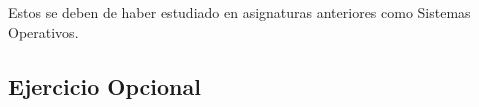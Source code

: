 
Estos se deben de haber estudiado en asignaturas anteriores como Sistemas Operativos.

\subsection{Ejercicio Opcional}


